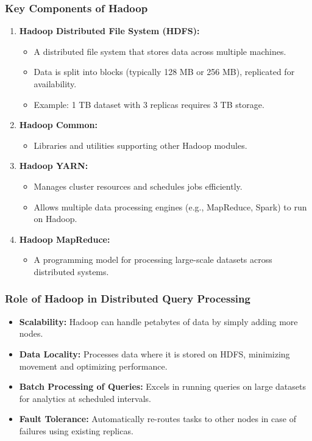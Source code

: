 \documentclass[aspectratio=169]{beamer}
\begin{document}
\begin{frame}[fragile]
    \frametitle{Key Components of Hadoop}
    \begin{enumerate}
        \item \textbf{Hadoop Distributed File System (HDFS):}
        \begin{itemize}
            \item A distributed file system that stores data across multiple machines.
            \item Data is split into blocks (typically 128 MB or 256 MB), replicated for availability.
            \item Example: 1 TB dataset with 3 replicas requires 3 TB storage.
        \end{itemize}
        
        \item \textbf{Hadoop Common:}
        \begin{itemize}
            \item Libraries and utilities supporting other Hadoop modules.
        \end{itemize}
        
        \item \textbf{Hadoop YARN:}
        \begin{itemize}
            \item Manages cluster resources and schedules jobs efficiently.
            \item Allows multiple data processing engines (e.g., MapReduce, Spark) to run on Hadoop.
        \end{itemize}
        
        \item \textbf{Hadoop MapReduce:}
        \begin{itemize}
            \item A programming model for processing large-scale datasets across distributed systems.
        \end{itemize}
    \end{enumerate}
\end{frame}

\begin{frame}[fragile]
    \frametitle{Role of Hadoop in Distributed Query Processing}
    \begin{itemize}
        \item \textbf{Scalability:} 
        Hadoop can handle petabytes of data by simply adding more nodes.
        
        \item \textbf{Data Locality:} 
        Processes data where it is stored on HDFS, minimizing movement and optimizing performance.
        
        \item \textbf{Batch Processing of Queries:} 
        Excels in running queries on large datasets for analytics at scheduled intervals.
        
        \item \textbf{Fault Tolerance:} 
        Automatically re-routes tasks to other nodes in case of failures using existing replicas.
    \end{itemize}
\end{frame}
\end{document}
